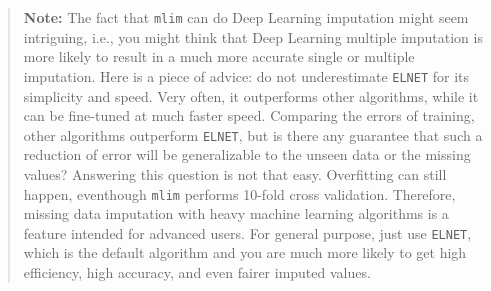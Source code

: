 \begin{quotation}
    \textbf{Note:} The fact that \texttt{mlim} can do Deep Learning imputation might seem intriguing, i.e., you might think that Deep Learning multiple imputation is more likely to result in a much more accurate single or multiple imputation. Here is a piece of advice: do not underestimate \texttt{ELNET} for its simplicity and speed. Very often, it outperforms other algorithms, while it can be fine-tuned at much faster speed. Comparing the errors of training, other algorithms outperform \texttt{ELNET}, but is there any guarantee that such a reduction of error will be generalizable to the unseen data or the missing values? Answering this question is not that easy. Overfitting can still happen, eventhough \texttt{mlim} performs 10-fold cross validation. Therefore, missing data imputation with heavy machine learning algorithms is a feature intended for advanced users. For general purpose, just use \texttt{ELNET}, which is the default algorithm and you are much more likely to get high efficiency, high accuracy, and even fairer imputed values.  
\end{quotation}